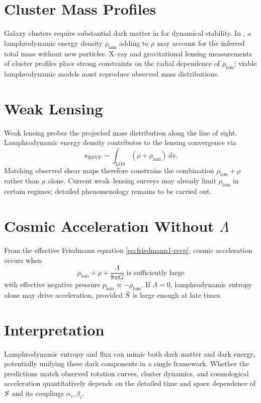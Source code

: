 \section{Cluster Mass Profiles}

Galaxy clusters require substantial dark matter in \LCDM{} for dynamical
stability. In \rsvpabbr{}, a lamphrodynamic energy density
$\rho_{\mathrm{lam}}$ adding to $\rho$ may account for the inferred total
mass without new particles. X--ray and gravitational lensing measurements
of cluster profiles place strong constraints on the radial dependence of
$\rho_{\mathrm{lam}}$; viable lamphrodynamic models must reproduce observed
mass distributions.

\section{Weak Lensing}

Weak lensing probes the projected mass distribution along the line of
sight. Lamphrodynamic energy density contributes to the lensing
convergence via
\[
  \kappa_{\mathrm{RSVP}}
  \sim \int_{\text{LOS}}
       (\rho + \rho_{\mathrm{lam}})\,ds.
\]
Matching observed shear maps therefore constrains the combination
$\rho_{\mathrm{lam}} + \rho$ rather than $\rho$ alone. Current weak--lensing
surveys may already limit $\rho_{\mathrm{lam}}$ in certain regimes; detailed
phenomenology remains to be carried out.

\section{Cosmic Acceleration Without $\Lambda$}

From the effective Friedmann equation \eqref{eq:friedmann1-rsvp}, cosmic
acceleration occurs when
\[
  \rho_{\mathrm{lam}} + \rho + \frac{\Lambda}{8\pi G}
  \text{ is sufficiently large}
\]
with effective negative pressure $p_{\mathrm{lam}}\approx -\rho_{\mathrm{lam}}$.
If $\Lambda=0$, lamphrodynamic entropy alone may drive acceleration, provided
$\dot{S}$ is large enough at late times.

\section{Interpretation}

Lamphrodynamic entropy and flux can mimic both dark matter and dark energy,
potentially unifying these dark components in a single framework. Whether
the \rsvpabbr{} predictions match observed rotation curves, cluster dynamics,
and cosmological acceleration quantitatively depends on the detailed time and
space dependence of $S$ and its couplings $\alpha_i,\beta_i$.

